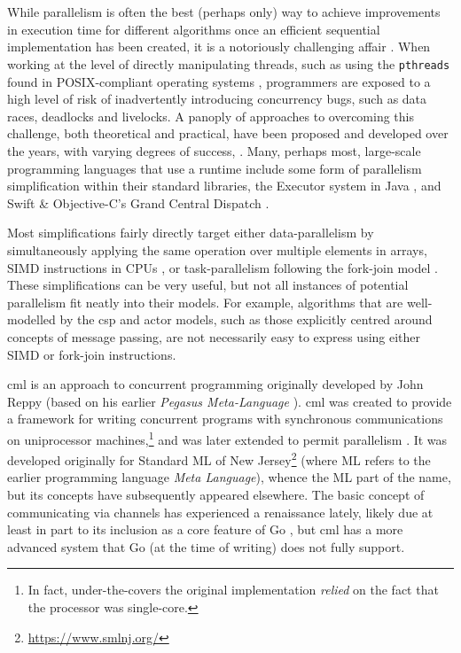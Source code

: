 \section{\label{sec:back:cml}}

While parallelism is often the best (perhaps only) way to achieve improvements in execution time for different algorithms once an efficient sequential implementation has been created, it is a notoriously challenging affair \cite{Shun2017}.  When working at the level of directly manipulating threads, such as using the \texttt{pthreads} found in POSIX-compliant operating systems \cite{posix2017}, programmers are exposed to a high level of risk of inadvertently introducing concurrency bugs, such as data races, deadlocks and livelocks.  A panoply of approaches to overcoming this challenge, both theoretical and practical, have been proposed and developed over the years, with varying degrees of success, \eg{} \cite{Boyapati2002,Bocq2012,Seinstra2004}.  Many, perhaps most, large-scale programming languages that use a runtime include some form of parallelism simplification within their standard libraries, \eg{} the Executor system in Java \cite[Ch. 4]{Fernandez2012}, and Swift \& Objective-C's Grand Central Dispatch \cite{Maskrey2018}.

Most simplifications fairly directly target either data-parallelism by simultaneously applying the same operation over multiple elements in arrays, \eg{} SIMD instructions in CPUs \cite{Hughes2015}, or task-parallelism following the fork-join model \cite{McCool2012}.  These simplifications can be very useful, but not all instances of potential parallelism fit neatly into their models.  For example, algorithms that are well-modelled by the \gls{csp} and \gls{actor} models, such as those explicitly centred around concepts of message passing, are not necessarily easy to express using either SIMD or fork-join instructions.

\Gls{cml} \cite{Reppy1991,Panangaden1997} is an approach to concurrent programming originally developed by John Reppy (based on his earlier \emph{Pegasus Meta-Language} \cite{Reppy1988}).  \Gls{cml} was created to provide a framework for writing concurrent programs with synchronous communications on uniprocessor machines,\footnote{In fact, under-the-covers the original implementation \emph{relied} on the fact that the processor was single-core.} and was later extended to permit parallelism \cite{Reppy2009a}.  It was developed originally for Standard ML of New Jersey\footnote{\url{https://www.smlnj.org/}} (where ML refers to the earlier programming language \emph{Meta Language}), whence the ML part of the name, but its concepts have subsequently appeared elsewhere.  The basic concept of communicating via channels has experienced a renaissance lately, likely due at least in part to its inclusion as a core feature of Go \cite{Meyerson2014}, but \gls{cml} has a more advanced system that Go (at the time of writing) does not fully support.

